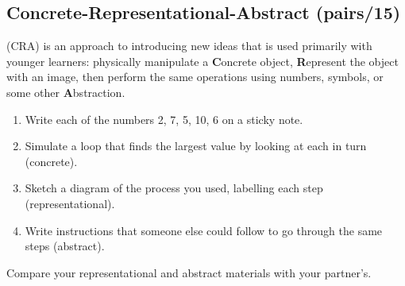 \subsection*{Concrete-Representational-Abstract (pairs/15)}

 (CRA)
is an approach to introducing new ideas
that is used primarily with younger learners:
physically manipulate a \textbf{C}oncrete object,
\textbf{R}epresent the object with an image,
then perform the same operations
using numbers, symbols, or some other \textbf{A}bstraction.

\begin{enumerate}

\item
  Write each of the numbers 2, 7, 5, 10, 6 on a sticky note.

\item
  Simulate a loop that finds the largest value by looking at each in turn (concrete).

\item
  Sketch a diagram of the process you used,
  labelling each step (representational).

\item
  Write instructions that someone else could follow
  to go through the same steps (abstract).
\end{enumerate}

Compare your representational and abstract materials with your partner's.
